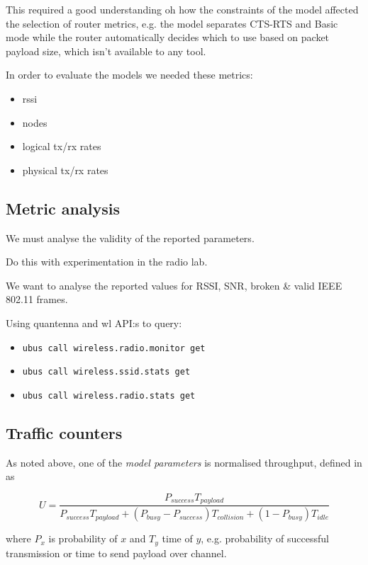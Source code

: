 This required a good understanding oh how the constraints of the model affected the selection of router metrics, e.g. the model separates CTS-RTS and Basic mode while the router automatically decides which to use based on packet payload size, which isn't available to any tool.

In order to evaluate the models we needed these metrics:

\begin{itemize}
\item rssi
\item nodes
\item logical tx/rx rates
\item physical tx/rx rates
\end{itemize}

\subsection{Metric analysis}

We must analyse the validity of the reported parameters.

Do this with experimentation in the radio lab.

We want to analyse the reported values for RSSI, SNR, broken \& valid IEEE
802.11 frames.

Using quantenna and wl API:s to query:
\begin{itemize}
    \item \texttt{ubus call wireless.radio.monitor get}
    \item \texttt{ubus call wireless.ssid.stats get}
    \item \texttt{ubus call wireless.radio.stats get}
\end{itemize}

\subsection{Traffic counters}

As noted above, one of the \emph{model parameters} is normalised throughput,
defined in \cite{felemban} as

\begin{equation}
U = \frac{P_{success}T_{payload}}{P_{success}T_{payload} + (P_{busy} -
P_{success})T_{collision} + (1 - P_{busy})T_{idle}}
\end{equation}

where $P_x$ is probability of $x$ and $T_y$ time of $y$, e.g. probability of successful transmission or time to send payload over channel.

